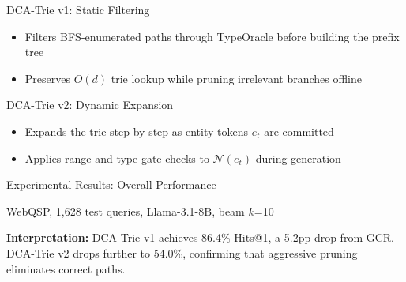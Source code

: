 \documentclass{beamer}
\begin{document}
\begin{frame}{DCA-Trie v1: Static Filtering}
  \begin{itemize}
    \item Filters BFS-enumerated paths through TypeOracle before building the prefix tree
    \item Preserves $O(d)$ trie lookup while pruning irrelevant branches offline
  \end{itemize}
\end{frame}

\begin{frame}{DCA-Trie v2: Dynamic Expansion}
  \begin{itemize}
    \item Expands the trie step-by-step as entity tokens $e_t$ are committed
    \item Applies range and type gate checks to $\mathcal{N}(e_t)$ during generation
  \end{itemize}
\end{frame}

\begin{frame}{Experimental Results: Overall Performance}
\centering
{}

\vspace{0.3em}
\footnotesize WebQSP, 1,628 test queries, Llama-3.1-8B, beam $k$=10

\vspace{0.5em}
\textbf{Interpretation:} DCA-Trie v1 achieves 86.4\% Hits@1, a 5.2pp drop from GCR. DCA-Trie v2 drops further to 54.0\%, confirming that aggressive pruning eliminates correct paths.
\end{frame}
\end{document}
